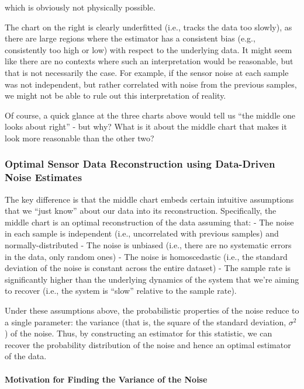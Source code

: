 \documentclass[11pt]{article}
\begin{document}
    which is obviously not physically possible.

    The chart on the right is clearly underfitted (i.e., tracks the data too
slowly), as there are large regions where the estimator has a consistent
bias (e.g., consistently too high or low) with respect to the underlying
data. It might seem like there are no contexts where such an
interpretation would be reasonable, but that is not necessarily the
case. For example, if the sensor noise at each sample was not
independent, but rather correlated with noise from the previous samples,
we might not be able to rule out this interpretation of reality.

    Of course, a quick glance at the three charts above would tell us ``the
middle one looks about right'' - but why? What is it about the middle
chart that makes it look more reasonable than the other two?

    \hypertarget{optimal-sensor-data-reconstruction-using-data-driven-noise-estimates}{%
\subsubsection{Optimal Sensor Data Reconstruction using Data-Driven
Noise
Estimates}\label{optimal-sensor-data-reconstruction-using-data-driven-noise-estimates}}

The key difference is that the middle chart embeds certain intuitive
assumptions that we ``just know'' about our data into its
reconstruction. Specifically, the middle chart is an optimal
reconstruction of the data assuming that: - The noise in each sample is
independent (i.e., uncorrelated with previous samples) and
normally-distributed - The noise is unbiased (i.e., there are no
systematic errors in the data, only random ones) - The noise is
homoscedastic (i.e., the standard deviation of the noise is constant
across the entire dataset) - The sample rate is significantly higher
than the underlying dynamics of the system that we're aiming to recover
(i.e., the system is ``slow'' relative to the sample rate).

Under these assumptions above, the probabilistic properties of the noise
reduce to a single parameter: the variance (that is, the square of the
standard deviation, \(\sigma^2\)) of the noise. Thus, by constructing an
estimator for this statistic, we can recover the probability
distribution of the noise and hence an optimal estimator of the data.

    \hypertarget{motivation-for-finding-the-variance-of-the-noise}{%
\paragraph{Motivation for Finding the Variance of the
Noise}\label{motivation-for-finding-the-variance-of-the-noise}}
\end{document}
